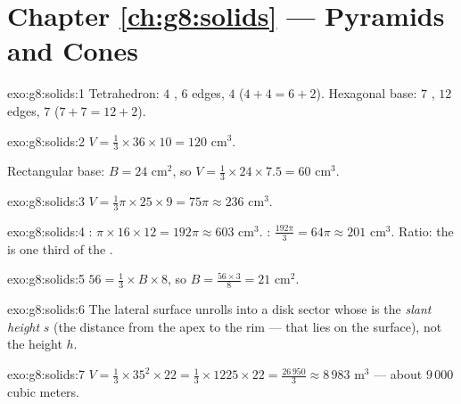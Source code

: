\section*{Chapter \ref{ch:g8:solids} --- Pyramids and Cones}

\begin{solution}{exo:g8:solids:1}
Tetrahedron: $4$ , $6$ edges, $4$ 
($4 + 4 = 6 + 2$). Hexagonal base: $7$ , $12$ edges, $7$
 ($7 + 7 = 12 + 2$).
\end{solution}

\begin{solution}{exo:g8:solids:2}
$V = \frac13 \times 36 \times 10 = 120$ cm$^3$.

Rectangular base: $B = 24$ cm$^2$, so
$V = \frac13 \times 24 \times 7.5 = 60$ cm$^3$.
\end{solution}

\begin{solution}{exo:g8:solids:3}
$V = \frac13 \pi \times 25 \times 9 = 75\pi \approx 236$ cm$^3$.
\end{solution}

\begin{solution}{exo:g8:solids:4}
: $\pi \times 16 \times 12 = 192\pi \approx 603$ cm$^3$.
: $\frac{192\pi}{3} = 64\pi \approx 201$ cm$^3$. Ratio: the 
is one third of the .
\end{solution}

\begin{solution}{exo:g8:solids:5}
$56 = \frac13 \times B \times 8$, so $B = \frac{56 \times 3}{8} = 21$
cm$^2$.
\end{solution}

\begin{solution}{exo:g8:solids:6}
The lateral surface unrolls into a disk sector whose  is the
\emph{slant height} $s$ (the distance from the apex to the rim ---
that  lies on the surface), not the height $h$.
\end{solution}

\begin{solution}{exo:g8:solids:7}
$V = \frac13 \times 35^2 \times 22 = \frac13 \times 1225 \times 22
= \frac{26\,950}{3} \approx 8\,983$ m$^3$ --- about $9\,000$ cubic
meters.
\end{solution}

